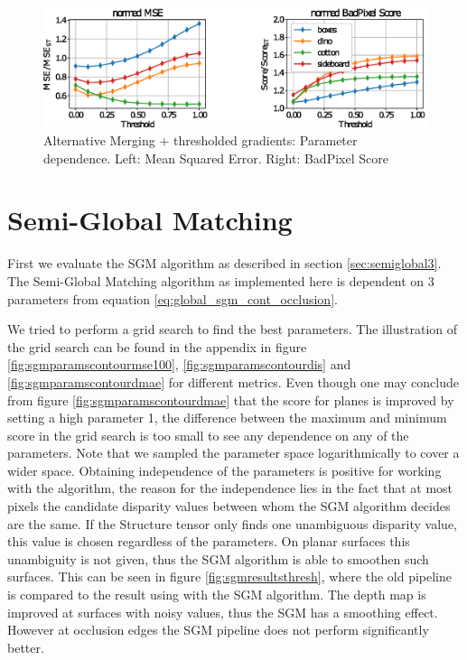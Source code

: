 \documentclass  [
  paper    = a4,
  BCOR     = 10mm,
  twoside,
  fontsize = 12pt,
  fleqn,
  toc      = bibnumbered,
  toc      = listofnumbered,
  numbers  = noendperiod,
  headings = normal,
  listof   = leveldown,
  version  = 3.03
]                                       {scrreprt}
\begin{document}
\begin{figure}
	\centering
	\includegraphics[width=1\linewidth]{images/choose_lower_params_thresh}
	\caption[Alternative Merging: Parameter dependence]{Alternative Merging + thresholded gradients: Parameter dependence. Left: Mean Squared Error. Right: BadPixel Score}
	\label{fig:chooselowerparamsthresh}
\end{figure}






\section{Semi-Global Matching}


First we evaluate the SGM algorithm as described in section \ref{sec:semiglobal3}.
The Semi-Global Matching algorithm as implemented here is dependent on 3 parameters from equation \ref{eq:global_sgm_cont_occlusion}.

 We tried to perform a grid search to find the best parameters. The illustration of the grid search can be found in the appendix in figure \ref{fig:sgmparamscontourmse100}, \ref{fig:sgmparamscontourdis} and \ref{fig:sgmparamscontourdmae} for different metrics. Even though one may conclude from  figure \ref{fig:sgmparamscontourdmae} that the score for planes is improved by setting a high parameter 1, the difference between the maximum and minimum score in the grid search is too small to see any dependence on any of the parameters. Note that we sampled the parameter space logarithmically to cover a wider space. Obtaining independence of the parameters is positive for working with the algorithm, the reason for the independence lies in the fact that at most pixels the candidate disparity values between whom the SGM algorithm decides are the same. If the Structure tensor only finds one unambiguous disparity value, this value is chosen regardless of the parameters. On planar surfaces this unambiguity is not given, thus the SGM algorithm is able to smoothen such surfaces. This can be seen in figure \ref{fig:sgmresultsthresh}, where the old pipeline is compared to the result using with the SGM algorithm. The depth map is improved at surfaces with noisy values, thus the SGM has a smoothing effect. However at occlusion edges the SGM pipeline does not perform significantly better. 
\end{document}
